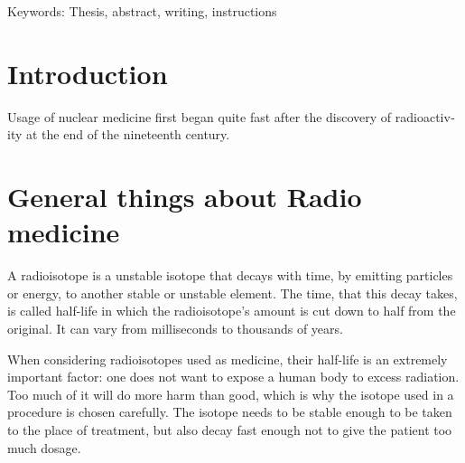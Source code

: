 \documentclass[final]{jyflluk}
\begin{document}
Keywords: Thesis, abstract, writing, instructions
\begin{otherlanguage}{english}







\tableofcontents

\section{Introduction}
\label{sec:intro}

Usage of nuclear medicine first began quite fast after the discovery of radioactivity at the end of the nineteenth century.




\section{General things about Radio medicine}
\label{sec:general}

A radioisotope is a unstable isotope that decays with time, by emitting particles or energy, to another stable or unstable element. The time, that this decay takes, is called half-life in which the radioisotope's amount is cut down to half from the original. It can vary from milliseconds to thousands of years.

When considering radioisotopes used as medicine, their half-life is an extremely important factor: one does not want to expose a human body to excess radiation. Too much of it will do more harm than good, which is why the isotope used in a procedure is chosen carefully. The isotope needs to be stable enough to be taken to the place of treatment, but also decay fast enough not to give the patient too much dosage. 


\end{otherlanguage}
\end{document}
